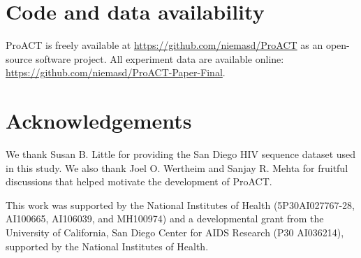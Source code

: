 \documentclass[oupdraft]{sysbio}
\begin{document}
\section{Code and data availability}
ProACT is freely available at \url{https://github.com/niemasd/ProACT} as an open-source software project.
All experiment data are available online: \url{https://github.com/niemasd/ProACT-Paper-Final}.


\section{Acknowledgements}
We thank Susan B. Little for providing the San Diego HIV sequence dataset used in this study.
We also thank Joel O. Wertheim and Sanjay R. Mehta for fruitful discussions that helped motivate the development of ProACT.

This work was supported by the National Institutes of Health (5P30AI027767-28, AI100665, AI106039, and MH100974) and a developmental grant from the University of California, San Diego Center for AIDS Research (P30 AI036214), supported by the National Institutes of Health.

\bigskip\bigskip



\end{document}
